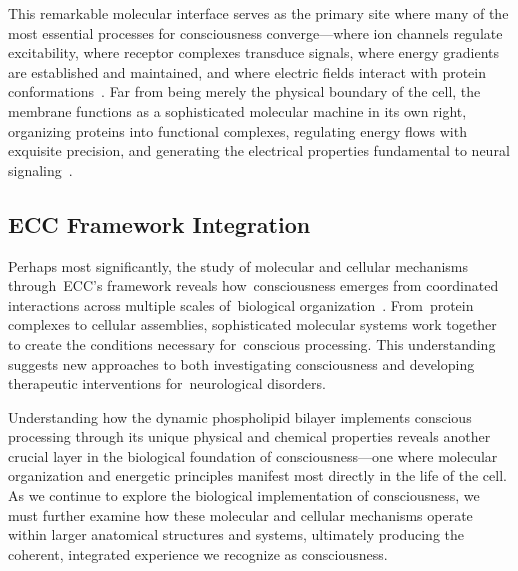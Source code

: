 This remarkable molecular interface serves as the primary site where many of the most essential processes for consciousness converge—where ion channels regulate excitability, where receptor complexes transduce signals, where energy gradients are established and maintained, and where electric fields interact with protein conformations~\cite{Garcia-Parajo2014, Kusumi2012}. Far from being merely the physical boundary of the cell, the membrane functions as a sophisticated molecular machine in its own right, organizing proteins into functional complexes, regulating energy flows with exquisite precision, and generating the electrical properties fundamental to neural signaling~\cite{Goni2014, Lingwood2010}.

\subsection*{ECC Framework Integration~}

Perhaps most significantly, the study of molecular and cellular mechanisms through~ECC's framework reveals how~consciousness emerges from coordinated interactions across multiple scales of~biological organization~\cite{Sudhof2018, Hyman2014}. From~protein complexes to cellular assemblies, sophisticated molecular systems work together to create the conditions necessary for~conscious processing. This understanding suggests new approaches to both investigating consciousness and developing therapeutic interventions for~neurological disorders.

Understanding how the dynamic phospholipid bilayer implements conscious processing through its unique physical and chemical properties reveals another crucial layer in the biological foundation of consciousness—one where molecular organization and energetic principles manifest most directly in the life of the cell. As we continue to explore the biological implementation of consciousness, we must further examine how these molecular and cellular mechanisms operate within larger anatomical structures and systems, ultimately producing the coherent, integrated experience we recognize as consciousness.
